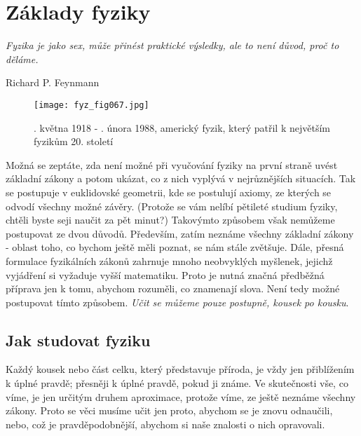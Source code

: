 {
\chapter{Základy fyziky}\label{fyz:IchapI}
\epigraph{\emph{Fyzika je jako sex, může přinést praktické výsledky, ale to není důvod, proč to 
  děláme.}}{Richard P. Feynmann}

\minitoc

  \begin{figure}[ht!]  %
    \centering
    \texttt{[image: fyz\_fig067.jpg]}
    \caption{\wikiFeynman {}. května 1918 - . února 1988, 
             americký fyzik, který patřil k největším fyzikům 20. století}
    \label{fyz:fig067}
  \end{figure} 

    Možná se zeptáte, zda není možné při vyučování fyziky na první straně uvést základní zákony a 
    potom ukázat, co z nich vyplývá v nejrůznějších situacích. Tak se postupuje v euklidovské 
    geometrii, kde se postulují axiomy, ze kterých se odvodí všechny možné závěry. (Protože se vám 
    nelíbí pětileté studium fyziky, chtěli byste seji naučit za pět minut?) Takovýmto způsobem však 
    nemůžeme postupovat ze dvou důvodů. Především, zatím neznáme všechny základní zákony - oblast 
    toho, co bychom ještě měli poznat, se nám stále zvětšuje. Dále, přesná formulace fyzikálních 
    zákonů zahrnuje mnoho neobvyklých myšlenek, jejichž vyjádření si vyžaduje vyšší matematiku. 
    Proto je nutná značná předběžná příprava jen k tomu, abychom rozuměli, co znamenají slova. Není 
    tedy možné postupovat tímto způsobem. \emph{Učit se můžeme pouze postupně, kousek po kousku}.

  \section{Jak studovat fyziku}\label{fyz:IchapIsecI}
    Každý kousek nebo část celku, který představuje příroda, je vždy jen přiblížením k úplné 
    pravdě; přesněji k úplné pravdě, pokud ji známe. Ve skutečnosti vše, co víme, je jen určitým 
    druhem aproximace, protože víme, ze ještě neznáme všechny zákony. Proto se věci musíme učit jen 
    proto, abychom se je znovu odnaučili, nebo, což je pravděpodobnější, abychom si naše znalosti o 
    nich opravovali.
    
}
